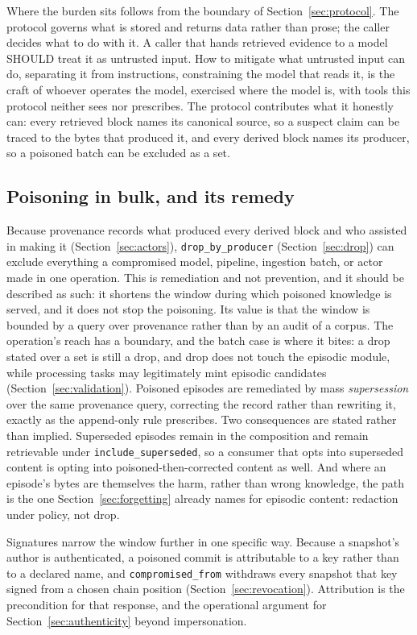 \documentclass[11pt,a4paper]{article}
\begin{document}
Where the burden sits follows from the boundary of
Section~\ref{sec:protocol}. The protocol governs what is stored and returns data
rather than prose; the caller decides what to do with it. A caller that hands retrieved evidence to a model SHOULD treat it as untrusted
input. How to mitigate what untrusted input can do, separating it from
instructions, constraining the model that reads it, is the craft of whoever
operates the model, exercised where the model is, with tools this protocol
neither sees nor prescribes. The protocol contributes what it honestly can:
every retrieved block names its canonical source, so a suspect claim can be
traced to the bytes that produced it, and every derived block names its
producer, so a poisoned batch can be excluded as a set.

\subsection{Poisoning in bulk, and its remedy}
\label{sec:bulk-poisoning}

Because provenance records what produced every derived block and who assisted in
making it (Section~\ref{sec:actors}), \texttt{drop\_by\_producer}
(Section~\ref{sec:drop}) can exclude everything a compromised model, pipeline,
ingestion batch, or actor made in one operation. This is remediation and not
prevention, and it should be described as such: it shortens the window during
which poisoned knowledge is served, and it does not stop the poisoning. Its value is that the window is bounded by a query over provenance rather than
by an audit of a corpus. The operation's reach has a boundary, and the batch
case is where it bites: a drop stated over a set is still a drop, and drop
does not touch the episodic module, while processing tasks may legitimately
mint episodic candidates (Section~\ref{sec:validation}). Poisoned episodes are
remediated by mass \emph{supersession} over the same provenance query,
correcting the record rather than rewriting it, exactly as the append-only
rule prescribes. Two consequences are stated rather than implied. Superseded
episodes remain in the composition and remain retrievable under
\texttt{include\_superseded}, so a consumer that opts into superseded content
is opting into poisoned-then-corrected content as well. And where an episode's bytes are themselves the harm, rather than wrong
knowledge, the path is the one Section~\ref{sec:forgetting} already names for
episodic content: redaction under policy, not drop.

Signatures narrow the window further in one specific way. Because a snapshot's
author is authenticated, a poisoned commit is attributable to a key rather than to
a declared name, and \texttt{compromised\_from} withdraws every snapshot that key
signed from a chosen chain position (Section~\ref{sec:revocation}). Attribution is the precondition for that response, and the operational
argument for Section~\ref{sec:authenticity} beyond impersonation.
\end{document}
